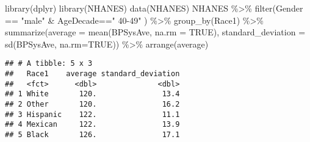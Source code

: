 \documentclass[
]{article}
\newenvironment{Shaded}{\begin{snugshade}}{\end{snugshade}}
\newcommand{\AttributeTok}[1]{\textcolor[rgb]{0.77,0.63,0.00}{#1}}
\newcommand{\ConstantTok}[1]{\textcolor[rgb]{0.00,0.00,0.00}{#1}}
\newcommand{\FunctionTok}[1]{\textcolor[rgb]{0.00,0.00,0.00}{#1}}
\newcommand{\NormalTok}[1]{#1}
\newcommand{\SpecialCharTok}[1]{\textcolor[rgb]{0.00,0.00,0.00}{#1}}
\newcommand{\StringTok}[1]{\textcolor[rgb]{0.31,0.60,0.02}{#1}}
\begin{document}
\begin{Shaded}
\begin{Highlighting}[]
\FunctionTok{library}\NormalTok{(dplyr)}
\FunctionTok{library}\NormalTok{(NHANES)}
\FunctionTok{data}\NormalTok{(NHANES)}
\NormalTok{NHANES }\SpecialCharTok{\%\textgreater{}\%}
      \FunctionTok{filter}\NormalTok{(Gender }\SpecialCharTok{==} \StringTok{"male"} \SpecialCharTok{\&}\NormalTok{ AgeDecade}\SpecialCharTok{==}\StringTok{" 40{-}49"}\NormalTok{ ) }\SpecialCharTok{\%\textgreater{}\%}
      \FunctionTok{group\_by}\NormalTok{(Race1) }\SpecialCharTok{\%\textgreater{}\%}
      \FunctionTok{summarize}\NormalTok{(}\AttributeTok{average =} \FunctionTok{mean}\NormalTok{(BPSysAve, }\AttributeTok{na.rm =} \ConstantTok{TRUE}\NormalTok{), }
            \AttributeTok{standard\_deviation =} \FunctionTok{sd}\NormalTok{(BPSysAve, }\AttributeTok{na.rm=}\ConstantTok{TRUE}\NormalTok{)) }\SpecialCharTok{\%\textgreater{}\%}
        \FunctionTok{arrange}\NormalTok{(average)}
\end{Highlighting}
\end{Shaded}

\begin{verbatim}
## # A tibble: 5 x 3
##   Race1    average standard_deviation
##   <fct>      <dbl>              <dbl>
## 1 White       120.               13.4
## 2 Other       120.               16.2
## 3 Hispanic    122.               11.1
## 4 Mexican     122.               13.9
## 5 Black       126.               17.1
\end{verbatim}
\end{document}
